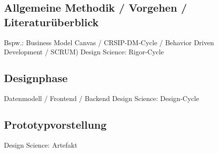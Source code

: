 \subsection{Allgemeine Methodik / Vorgehen / Literaturüberblick}\label{subsec:Methodik}
Bspw.: Business Model Canvas / CRSIP-DM-Cycle / Behavior Driven Development / SCRUM)
Design Science: Rigor-Cycle

\subsection{Designphase}\label{subsec:Designphase}
Datenmodell / Frontend / Backend
Design Science: Design-Cycle

\subsection{Prototypvorstellung}\label{subsec:Prototyp}
Design Science: Artefakt